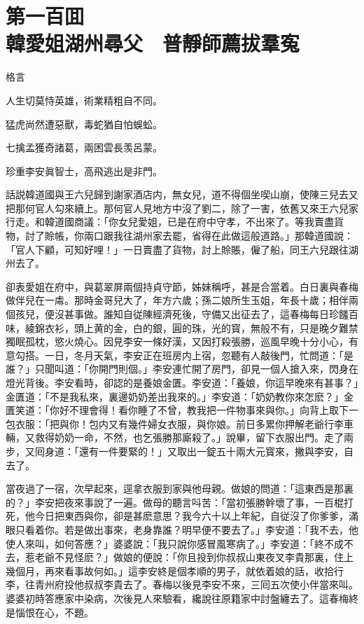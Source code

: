 
\chapter*{第一百囬　\\韓愛姐湖州尋父　普靜師薦拔羣寃}


格言
\begin{myquote}
人生切莫恃英雄，術業精粗自不同。

猛虎尚然遭惡獸，毒蛇猶自怕蜈蚣。

七擒孟獲奇諸葛，兩困雲長羡呂蒙。

珍重李安眞智士，高飛逃出是非門。
\end{myquote}

話説韓道國與王六兒歸到謝家酒店内，無女兒，道不得個坐喫山崩，使陳三兒去又把那何官人勾來續上。那何官人見地方中沒了劉二，除了一害，依舊又來王六兒家行走。和韓道國商議：「你女兒愛姐，已是在府中守孝，不出來了。等我賣盡貨物，討了賒帳，你兩口跟我往湖州家去罷，省得在此做這般道路。」那韓道國說：「官人下顧，可知好哩！」一日賣盡了貨物，討上賒賬，僱了船，同王六兒跟往湖州去了。

卻表愛姐在府中，與葛翠屏兩個持貞守節，姊妹稱呼，甚是合當着。白日裏與春梅做伴兒在一䖏。那時金哥兒大了，年方六歲；孫二娘所生玉姐，年長十歲；相伴兩個孩兒，便沒甚事做。誰知自従陳經濟死後，守備又出征去了，這春梅每日珍饈百味，綾錦衣衫，頭上黄的金，白的銀，圓的珠，光的寳，無般不有，只是晚夕難禁獨眠孤枕，慾火燒心。因見李安一條好漢，又因打殺張勝，巡風早晚十分小心，有意勾搭。一日，冬月天氣，李安正在班房内上宿，忽聽有人敲後門，忙問道：「是誰？」只聞叫道：「你開門則個。」李安連忙開了房門，卻見一個人搶入來，閃身在燈光背後。李安看時，卻認的是養娘金匱。李安道：「養娘，你這早晚來有甚事？」金匱道：「不是我私來，裏邊奶奶差出我來的。」李安道：「奶奶教你來怎麽？」金匱笑道：「你好不理會得！看你睡了不曾，教我把一件物事來與你。」向背上取下一包衣服：「把與你！包内又有幾件婦女衣服，與你娘。前日多累你押解老爺行李車輛，又救得奶奶一命，不然，也乞張勝那廝殺了。」說畢，留下衣服出門。走了兩步，又囘身道：「還有一件要緊的！」又取出一錠五十兩大元寳來，撇與李安，自去了。

當夜過了一宿，次早起來，逕拿衣服到家與他母親。做娘的問道：「這東西是那裏的？」李安把夜來事說了一遍。做母的聽言呌苦：「當初張勝幹壞了事，一百棍打死，他今日把東西與你，卻是甚麽意思？我今六十以上年紀，自従沒了你爹爹，滿眼只看着你。若是做出事來，老身靠誰？明早便不要去了。」李安道：「我不去，他使人來叫，如何答應？」婆婆說：「我只說你感冒風寒病了。」李安道：「終不成不去，惹老爺不見怪麽？」做娘的便說：「你且投到你叔叔山東夜叉李貴那裏，住上幾個月，再來看事故何如。」這李安終是個孝順的男子，就依着娘的話，收拾行李，往青州府投他叔叔李貴去了。春梅以後見李安不來，三囘五次使小伴當來叫。婆婆初時答應家中染病，次後見人來驗看，纔說往原籍家中討盤纏去了。這春梅終是惱恨在心，不題。


